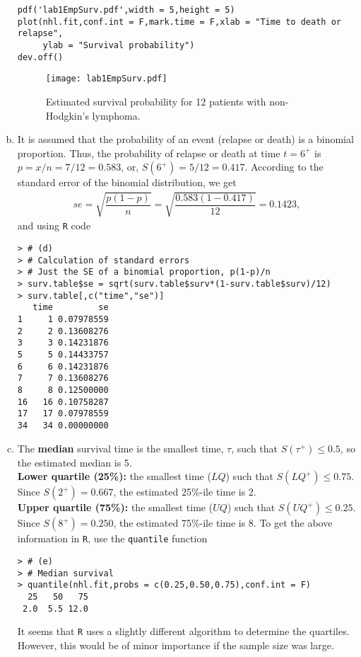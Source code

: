 \begin{enumerate}[(a)]
\begin{footnotesize}
\begin{verbatim}
pdf('lab1EmpSurv.pdf',width = 5,height = 5)
plot(nhl.fit,conf.int = F,mark.time = F,xlab = "Time to death or relapse",
     ylab = "Survival probability")
dev.off()
\end{verbatim}
\end{footnotesize}
\begin{figure}[htbp]
	\centering
		\texttt{[image: lab1EmpSurv.pdf]}
	\caption{Estimated survival probability for 12 patients
with non-Hodgkin’s lymphoma.}
	\label{figure1}
\end{figure}
\item It is assumed that the probability of an event (relapse or death) is a binomial 
proportion. Thus, the probability of relapse or death at time $t=6^+$
is $p=x/n = 7/12 = 0.583$, or, $S(6^{+}) = 5/12 = 0.417$. According to the standard error of the binomial distribution, we get
\begin{align}
se = \sqrt{\dfrac{p(1-p)}{n}} = \sqrt{\dfrac{0.583(1-0.417)}{12}} = 0.1423,
\nonumber
\end{align}
and using \verb|R| code
\begin{footnotesize}
\begin{verbatim}
> # (d)
> # Calculation of standard errors
> # Just the SE of a binomial proportion, p(1-p)/n
> surv.table$se = sqrt(surv.table$surv*(1-surv.table$surv)/12)
> surv.table[,c("time","se")]
   time         se
1     1 0.07978559
2     2 0.13608276
3     3 0.14231876
5     5 0.14433757
6     6 0.14231876
7     7 0.13608276
8     8 0.12500000
16   16 0.10758287
17   17 0.07978559
34   34 0.00000000
\end{verbatim}
\end{footnotesize}
\item The \textbf{median} survival time is the smallest time, $\tau$, such that
$S(\tau^{+})\leq 0.5$, so the estimated median is 5. \\
\textbf{Lower quartile (25\%):} the smallest time ($LQ$) such that
$S(LQ^{+})\leq 0.75$. Since $S(2^{+}) = 0.667$, the estimated 25\%-ile time is 2. \\
\textbf{Upper quartile (75\%):} the smallest time ($UQ$) such that 
$S(UQ^{+})\leq 0.25$. Since $S(8^{+}) = 0.250$, the estimated 75\%-ile time is 8. To get the above information in \verb|R|, use the \verb|quantile| function
\begin{footnotesize}
\begin{verbatim}
> # (e)
> # Median survival
> quantile(nhl.fit,probs = c(0.25,0.50,0.75),conf.int = F)
  25   50   75 
 2.0  5.5 12.0 
\end{verbatim}
\end{footnotesize}
It seems that \verb|R| uses a slightly different algorithm to determine the quartiles. However, this would be of minor importance if the sample size was large.
\end{enumerate}
